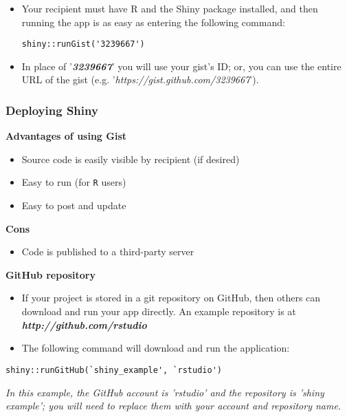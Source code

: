 \documentclass{beamer}
\begin{document}
\begin{frame}[fragile]
\Large
\begin{itemize}
\item Your recipient must have R and the Shiny package installed, and then running the app is as easy as entering the following command:

\begin{framed}
\begin{verbatim}
shiny::runGist('3239667')
\end{verbatim}
\end{framed}
\item In place of '\textit{\textbf{3239667}}' you will use your gist’s ID; or, you can use the entire URL of the gist (e.g. '\textit{https://gist.github.com/3239667}').
\end{itemize}
\end{frame}

\begin{frame}
\Large
\frametitle{Deploying Shiny}
\textbf{Advantages of using Gist} 
\begin{itemize}
\item Source code is easily visible by recipient (if desired)
\item Easy to run (for \texttt{R} users)
\item Easy to post and update
\end{itemize} 
\textbf{Cons} \begin{itemize}
\item Code is published to a third-party server
\end{itemize}
\end{frame}

\begin{frame}[fragile]
\Large
\textbf{GitHub repository}
\begin{itemize}
\item If your project is stored in a git repository on GitHub, then others can download and run your app directly. An example repository is at \textit{\textbf{http://github.com/rstudio}}
\item The following command will download and run the application:
\end{itemize}
\large
\begin{framed}
\begin{verbatim}
shiny::runGitHub(`shiny_example', `rstudio')
\end{verbatim}
\end{framed}
\normalsize
\textit{In this example, the GitHub account is 'rstudio' and the repository is 'shiny example'; you will need to replace them with your account and repository name.}
\end{frame}
\end{document}
